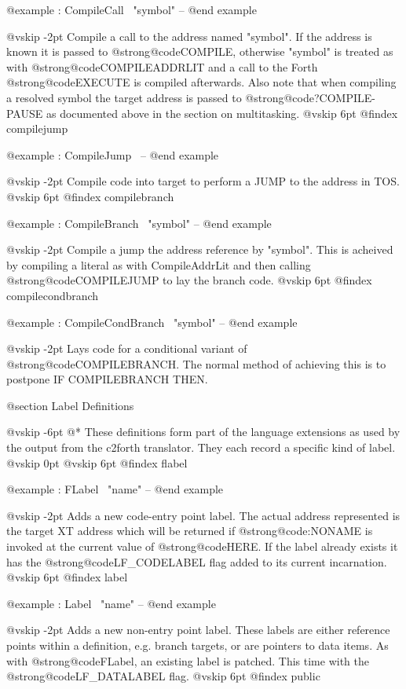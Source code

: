 @example
: CompileCall           \ "symbol" -- @end example

@vskip -2pt
Compile a call to the address named "symbol". If the address is
known it is passed to @strong{@code{COMPILE,}} otherwise  "symbol" is treated as
with @strong{@code{COMPILEADDRLIT}} and a call to the Forth @strong{@code{EXECUTE}} is compiled
afterwards. Also note that when compiling a resolved symbol the
target address is passed to @strong{@code{?COMPILE-PAUSE}} as documented above in
the section on multitasking.
@vskip 6pt
@findex compilejump

@example
: CompileJump           \ -- @end example

@vskip -2pt
Compile code into target to perform a JUMP to the address in TOS.
@vskip 6pt
@findex compilebranch

@example
: CompileBranch         \ "symbol" -- @end example

@vskip -2pt
Compile a jump the address reference by "symbol". This is acheived
by compiling a literal as with CompileAddrLit and then calling
@strong{@code{COMPILEJUMP}} to lay the branch code.
@vskip 6pt
@findex compilecondbranch

@example
: CompileCondBranch     \ "symbol" -- @end example

@vskip -2pt
Lays code for a conditional variant of @strong{@code{COMPILEBRANCH}}. The normal
method of achieving this is to postpone IF COMPILEBRANCH THEN.

@section Label Definitions


@vskip -6pt
@*
These definitions form part of the language extensions as used by
the output from the c2forth translator. They each record a specific
kind of label.
@vskip 0pt
@vskip 6pt
@findex flabel

@example
: FLabel                \ "name" -- @end example

@vskip -2pt
Adds a new code-entry point label. The actual address represented
is the target XT address which will be returned if @strong{@code{:NONAME}} is
invoked at the current value of @strong{@code{HERE}}. If the label already exists
it has the @strong{@code{LF_CODELABEL}} flag added to its current incarnation.
@vskip 6pt
@findex label

@example
: Label                 \ "name" -- @end example

@vskip -2pt
Adds a new non-entry point label. These labels are either reference
points within a definition, e.g. branch targets, or are pointers to
data items. As with @strong{@code{FLabel}}, an existing label is patched. This time
with the @strong{@code{LF_DATALABEL}} flag.
@vskip 6pt
@findex public

